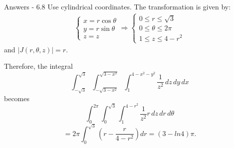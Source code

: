 \documentclass[aspectratio=169, UTF8]{beamer}
\begin{document}
\begin{frame}{Answers - 6.8}
    Use cylindrical coordinates. The transformation is given by:
\begin{align*}
\begin{cases}
x = r \cos \theta \\
y = r \sin \theta \\
z = z
\end{cases}
\Rightarrow
\begin{cases}
0 \leq r \leq \sqrt{3} \\
0 \leq \theta \leq 2\pi \\
1 \leq z \leq 4 - r^2
\end{cases}
\end{align*}
and $|J(r, \theta, z)| = r$.

Therefore, the integral
\[
\int_{-\sqrt{3}}^{\sqrt{3}} \int_{-\sqrt{3-x^2}}^{\sqrt{3-x^2}} \int_{1}^{4-x^2-y^2} \frac{1}{z^2} \, dz \, dy \, dx
\]
becomes
\[
\int_{0}^{2\pi} \int_{0}^{\sqrt{3}} \int_{1}^{4-r^2} \frac{1}{z^2} r \, dz \, dr \, d\theta 
\]
\[ 
= 2\pi \int_{0}^{\sqrt{3}} \left( r - \frac{r}{4 - r^2} \right) dr =(3-ln 4) \pi.
\]
\end{frame}
    
    
\end{document}
